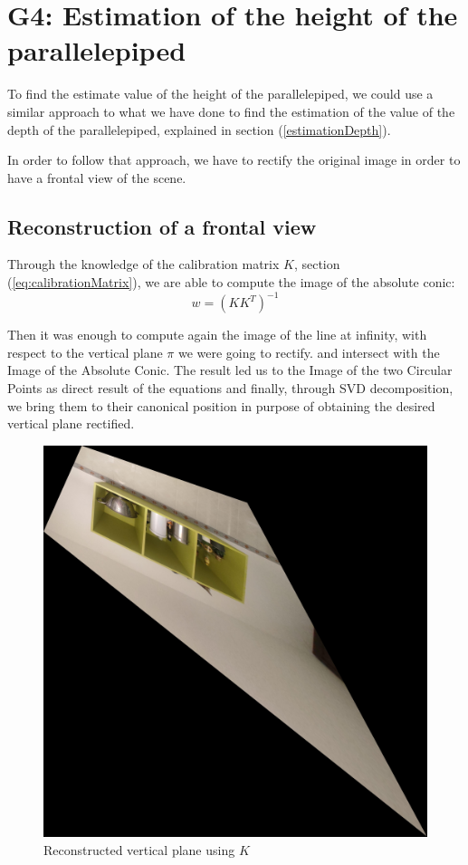 \section{G4: Estimation of the height of the parallelepiped}
To find the estimate value of the height of the parallelepiped, we could use a similar approach to what we have done to find the estimation of the value of the depth of the parallelepiped, explained in section (\ref{estimationDepth}).

In order to follow that approach, we have to rectify the original image in order to have a frontal view of the scene.

\subsection{Reconstruction of a frontal view}
Through the knowledge of the calibration matrix $K$, section (\ref{eq:calibrationMatrix}), we are able to compute the image of the absolute conic:
$$w=(KK^T)^{-1}$$

Then it was enough to compute again the image of the line at infinity, with respect to the vertical plane $\pi$ we were going to rectify. and intersect with the Image of the Absolute Conic.
The result led us to the Image of the two Circular Points as direct result of the equations and finally, through SVD decomposition, we bring them to their canonical position in purpose of obtaining the desired vertical plane rectified.

\begin{figure}[H]
    \centering
    \includegraphics[width=0.95\linewidth]{img/G3/verticalReconstructionK.jpg}
    \caption{Reconstructed vertical plane using $K$}
    \label{fig:verticalRectK}
\end{figure}

